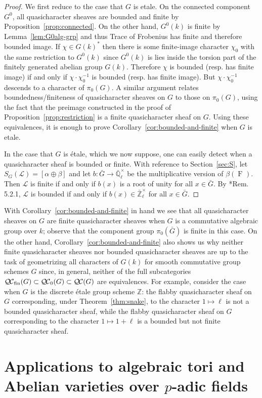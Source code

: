 \documentclass{amsart}
\theoremstyle{plain}
\theoremstyle{definition}
\theoremstyle{remark}
\newcommand{\ZZ}{{\mathbb{Z}}}
\newcommand{\EE}{\mathbb{\bar Q}_\ell}
\newcommand{\Fq}{k}
\newcommand{\EEx}{\EE^\times}
\newcommand{\Zlx}{\mathbb{\bar Z}_\ell^\times}
\newcommand{\Frob}[1]{\operatorname{F}_{#1}}
\newcommand{\qcs}[1]{{\mathcal{#1}}}
\newcommand{\QC}{{\mathcal{Q\hskip-0.8pt C}}}
\newcommand{\bQC}{{\QC_0}}
\newcommand{\fQC}{{\QC_\text{fin}}}
\begin{document}
\begin{proof}
We first reduce to the case that $G$ is etale.
On the connected component
$G^0$, all quasicharacter sheaves are bounded and finite by Proposition~\ref{prop:connected}.
On the other hand, $G^0(\Fq)$ is finite by Lemma~\ref{lem:G0alg-grp} and thus Trace of Frobenius
has finite and therefore bounded image.  If $\chi \in G(\Fq)^*$ then there is some finite-image character $\chi_0$
with the same restriction to $G^0(\Fq)$ since $G^0(\Fq)$ is lies inside the torsion part of
the finitely generated abelian group $G(\Fq)$.  Therefore $\chi$ is bounded (resp. has finite image)
if and only if $\chi \cdot \chi_0^{-1}$ is bounded (resp. has finite image).  But $\chi \cdot \chi_0^{-1}$ descends
to a character of $\pi_0(G)$.  A similar argument relates boundedness/finiteness of quasicharacter
sheaves on $G$ to those on $\pi_0(G)$, using the fact that the preimage constructed in the proof of
Proposition~\ref{prop:restriction} is a finite quasicharacter sheaf on $G$.
Using these equivalences, it is enough to prove Corollary~\ref{cor:bounded-and-finite} when $G$ is etale.

In the case that $G$ is \'etale, which we now suppose,
one can easily detect when a quasicharacter sheaf is bounded or finite.
With reference to Section~\ref{sec:S},
let $S_G(\qcs{L}) = [\alpha \oplus \beta]$
and let $b : {\bar G}\to \EEx$ be the multiplicative version of $\beta(\Frob{})$.
Then $\qcs{L}$ is finite if and only if
$b(x)$ is a root of unity for all $x\in {\bar G}$.
By \cite{beilinson-bernstein-deligne:81a}*{Rem. 5.2.1},
$\qcs{L}$ is bounded if and only if $b(x) \in \Zlx$ for all $x\in {\bar G}$.
\end{proof}

With Corollary~\ref{cor:bounded-and-finite} in hand
we see that all quasicharacter sheaves on $G$ are finite quasicharacter sheaves
when $G$ is a commutative algebraic group over $\Fq$;
observe that the component group $\pi_0({\bar G})$ is finite in this case.
On the other hand, Corollary~\ref{cor:bounded-and-finite} also shows us
why neither finite quasicharacter sheaves nor bounded quasicharacter sheaves
are up to the task of geometrizing all characters of $G(\Fq)$ for smooth commutative group schemes $G$ since, in general, neither of the full subcategories
$\fQC(G) \subset \bQC(G) \subset \QC(G)$ are equivalences.
For example, consider the case when $G$ is the discrete \'etale group scheme $\ZZ$:
the flabby quasicharacter sheaf on $G$ corresponding, under Theorem~\ref{thm:snake},
to the character $1 \mapsto \ell$ is not a bounded quasicharacter sheaf,
while the flabby quasicharacter sheaf on $G$ corresponding
to the character $1 \mapsto 1+ \ell$ is a bounded but not finite quasicharacter sheaf.

\section{Applications to algebraic tori and Abelian varieties over \texorpdfstring{$p$}{p}-adic fields}




\end{document}
